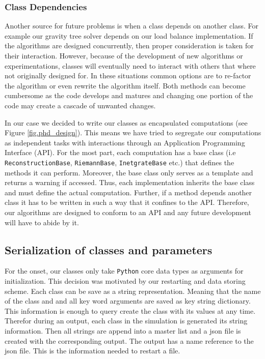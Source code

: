 \subsubsection{Class Dependencies}
Another source for future problems is when a class depends on another class. For example
our gravity tree solver depends on our load balance implementation. If the algorithms
are designed concurrently, then proper consideration is taken for their interaction.
However, because of the development of new algorithms or experimentations, 
classes will eventually need to interact with others that where not originally designed for. In these
situations common options are to re-factor the algorithm or even rewrite the algorithm itself. Both 
methods can become cumbersome as the code develops and matures and changing one portion of the code 
may create a cascade of unwanted changes.

In our case we decided to write our classes as encapsulated computations (see Figure 
\ref{fig.phd_design}). This means we have
tried to segregate our computations as independent tasks with interactions
through an Application Programming Interface (API). For the most part, each computation
has a base class (i.e \lstinline{ReconstructionBase}, \lstinline{RiemannBase}, 
\lstinline{InetgrateBase} etc.) that
defines the methods it can perform. Moreover, the base class only serves as a template and
returns a warning if accessed. Thus, each implementation inherits the base class and must define
the actual computation. Further, if a method depends another class it has to be written in
such a way that it confines to the API. Therefore, our algorithms are designed to conform to an API
and any future development will have to abide by it.

\subsection{Serialization of classes and parameters}
For the onset, our classes only take \texttt{Python} core data types as arguments for initialization.
This decision was motivated by our restarting and data storing scheme. Each class can be save as
a string representation. Meaning that the name of the class and and all key word arguments are
saved as key string dictionary. This information is enough to query create the class with its
values at any time. Therefor during an output, each class in the simulation is generated its
string information. Then all strings are append into a master list and a json file is created
with the corresponding output. The output has a name reference to the json file. This is the information
needed to restart a file.

